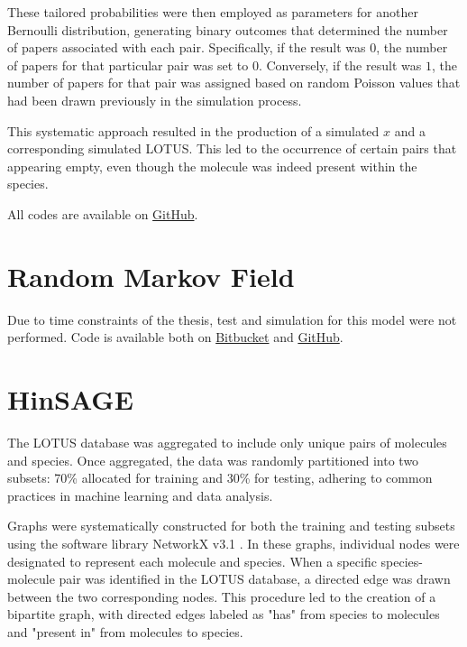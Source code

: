\documentclass[
11pt, %
oneside, %
english, %
singlespacing, %
headsepline, %
chapterinoneline, %
]{MastersDoctoralThesis} %
\begin{document}
These tailored probabilities were then employed as parameters for another Bernoulli distribution, generating binary outcomes that determined the number of papers associated with each pair. Specifically, if the result was $0$, the number of papers for that particular pair was set to $0$. Conversely, if the result was $1$, the number of papers for that pair was assigned based on random Poisson values that had been drawn previously in the simulation process.

This systematic approach resulted in the production of a simulated $x$ and a corresponding simulated LOTUS. This led to the occurrence of certain pairs that appearing empty, even though the molecule was indeed present within the species.

All codes are available on \href{https://github.com/commons-research/anticipated-lotus}{GitHub}.
 
\section{Random Markov Field}
Due to time constraints of the thesis, test and simulation for this model were not performed. Code is available both on \href{https://bitbucket.org/wegmannlab/metabolite_inference/src/master/}{Bitbucket} and \href{https://github.com/anticipated-lotus/metabolite_inference}{GitHub}.

\section{HinSAGE}\label{sec:methods:HinSAGE}
The LOTUS database was aggregated to include only unique pairs of molecules and species. Once aggregated, the data was randomly partitioned into two subsets: 70\% allocated for training and 30\% for testing, adhering to common practices in machine learning and data analysis.

Graphs were systematically constructed for both the training and testing subsets using the software library NetworkX v3.1 \cite{SciPyProceedings_11}. In these graphs, individual nodes were designated to represent each molecule and species. When a specific species-molecule pair was identified in the LOTUS database, a directed edge was drawn between the two corresponding nodes. This procedure led to the creation of a bipartite graph, with directed edges labeled as "has" from species to molecules and "present in" from molecules to species.
\end{document}
